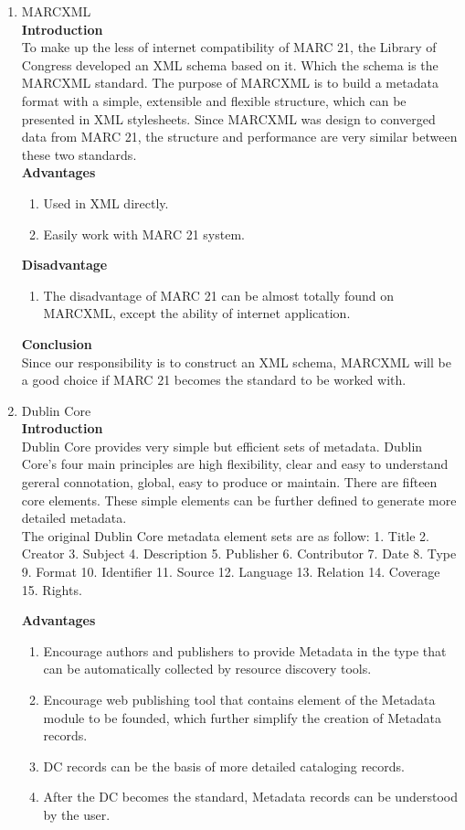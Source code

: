 \begin{enumerate}
	\item MARCXML\\
	{\bf Introduction}\\
	To make up the less of internet compatibility of MARC 21, the Library of Congress developed an XML schema based on it. Which the schema is the MARCXML standard. The purpose of MARCXML is to build a metadata format with a simple, extensible and flexible structure, which can be presented in XML stylesheets. Since MARCXML was design to converged data from MARC 21, the structure and performance are very similar between these two standards.\\
	{\bf Advantages}
	\begin{enumerate}
		\item Used in XML directly.
		\item Easily work with MARC 21 system.
	\end{enumerate}	
	{\bf Disadvantage}
	\begin{enumerate}
		\item The disadvantage of MARC 21 can be almost totally found on MARCXML, except the ability of internet application.
	\end{enumerate}
	{\bf Conclusion}\\
	Since our responsibility is to construct an XML schema, MARCXML will be a good choice if MARC 21 becomes the standard to be worked with.
	
	\item Dublin Core\\
	{\bf Introduction}\\
	Dublin Core provides very simple but efficient sets of metadata.
	Dublin Core’s four main principles are high flexibility, clear and easy to understand gereral connotation, global, easy to produce or maintain.
	There are fifteen core elements. These simple elements can be further defined to generate more detailed metadata.\\
	The original Dublin Core metadata element sets are as follow:
	1. Title 2. Creator 3. Subject 4. Description 5. Publisher 
	6. Contributor 7. Date 8. Type 9. Format 10. Identifier
	11. Source 12. Language 13. Relation 14. Coverage 15. Rights.
	\cite{NISO2012}
	
	{\bf Advantages}
	\begin{enumerate}
		\item Encourage authors and publishers to provide Metadata in the type that can be automatically collected by resource discovery tools.
		\item Encourage web publishing tool that contains element of the Metadata module to be founded, which further simplify the creation of Metadata records.
		\item DC records can be the basis of more detailed cataloging records.
		\item After the DC becomes the standard, Metadata records can be understood by the user.
	\end{enumerate}	
		

\end{enumerate}
